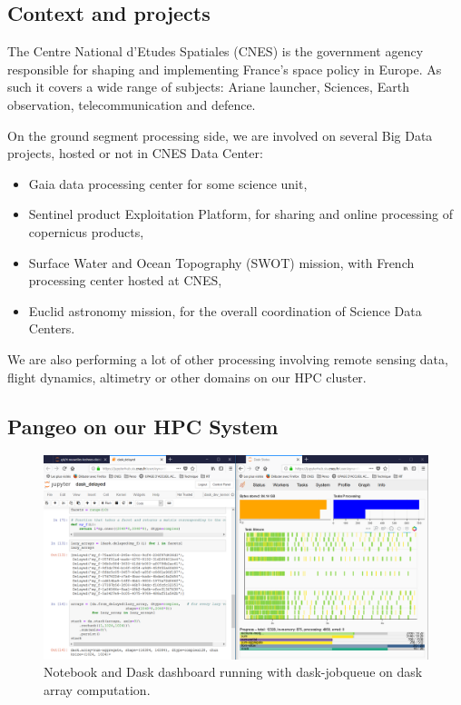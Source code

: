 \documentclass{article}
\begin{document}
\subsection{Context and projects}
\label{ssec:context}

The Centre National d'Etudes Spatiales (CNES) is the government agency responsible for shaping and implementing France's space policy in Europe. As such it covers a wide range of subjects: Ariane launcher, Sciences, Earth observation, telecommunication and defence.

On the ground segment processing side, we are involved on several Big Data projects, hosted or not in CNES Data Center:
\begin{itemize}
\item Gaia data processing center for some science unit,
\item Sentinel product Exploitation Platform, for sharing and online processing of copernicus products,
\item Surface Water and Ocean Topography (SWOT) mission, with French processing center hosted at CNES,
\item Euclid astronomy mission, for the overall coordination of Science Data Centers.
\end{itemize}

We are also performing a lot of other processing involving remote sensing data, flight dynamics, altimetry or other domains on our HPC cluster.

\subsection{Pangeo on our HPC System}
\label{ssec:pangeohpc}

\begin{figure}
  \centering
  \includegraphics[width=\columnwidth]{dask_jobqueue.png}
  \caption{\label{dask_jobqueue} Notebook and Dask dashboard running with dask-jobqueue on dask array computation.}
\end{figure}
\end{document}

